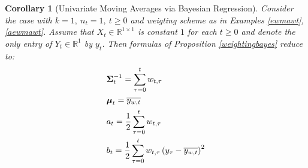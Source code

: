 \documentclass[10pt,fleqn]{amsart}
\newtheorem{corollary}[theorem]{Corollary}
\theoremstyle{definition}
\theoremstyle{remark}
\numberwithin{equation}{section}
\newcommand{\RR}{\mathbb{R}}
\newcommand{\mmu}{\boldsymbol{\mu}}
\newcommand{\SSigma}{\boldsymbol{\Sigma}}
\begin{document}
\begin{corollary}[Univariate Moving Averages via Bayesian Regression]
Consider the case with $k=1,\ n_t=1,\ t\geq0$ and weigting scheme as in Examples \ref{ewmawt}, \ref{aewmawt}.
Assume that $X_t\in\RR^{1\times 1}$ is constant $1$ for each $t\geq 0$ and denote the only entry of $Y_t\in \RR^1$ by $y_t$.
Then formulas of Proposition \ref{weightingbayes} reduce to:
\begin{align}\displaystyle
    &\SSigma_t^{-1}=\sum_{\tau=0}^t w_{t,\tau}\\
    &\mmu_t=\overline{y_{w,t}}\\
    &a_t=\frac 12\sum_{\tau=0}^t w_{t,\tau}\\
    &b_t=\frac 12\sum_{\tau=0}^t w_{t,\tau}\left(y_\tau-\overline{y_{w,t}}\right)^2
\end{align}
\end{corollary}
\end{document}
